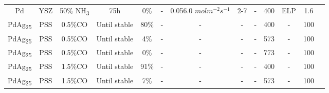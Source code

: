 \begin{longtable}{@{\extracolsep{\fill}}ccccccccccccc@{}}
    Pd                               & YSZ               & 50\% NH\textsubscript{3} & 75h        & 0\%               & -  & 0.056.0 $mol m^{-2} s^{-1}$       & 2-7                              & -           & 400                                    & ELP                   & 1.6                                                                                & \cite{Lundin2016}                  \\

    PdAg\textsubscript{25}                               & PSS               & 0.5\%CO & Until stable        & 80\%               & -  & -       & -                              & -           & 400                                    & -                   & 100                                                                                & \cite{Nguyen2009}                  \\

    PdAg\textsubscript{25}                               & PSS               & 0.5\%CO & Until stable        & 4\%               & -  & -       & -                              & -           & 573                                    & -                   & 100                                                                                & \cite{Nguyen2009}                  \\

    PdAg\textsubscript{25}                               & PSS               & 0.5\%CO & Until stable        & 0\%               & -  & -       & -                              & -           & 773                                    & -                   & 100                                                                                & \cite{Nguyen2009}                  \\

    PdAg\textsubscript{25}                               & PSS               & 1.5\%CO & Until stable        & 91\%               & -  & -       & -                              & -           & 400                                    & -                   & 100                                                                                & \cite{Nguyen2009}                  \\

    PdAg\textsubscript{25}                               & PSS               & 1.5\%CO & Until stable        & 7\%               & -  & -       & -                              & -           & 573                                    & -                   & 100                                                                                & \cite{Nguyen2009}                  \\


\end{longtable}
